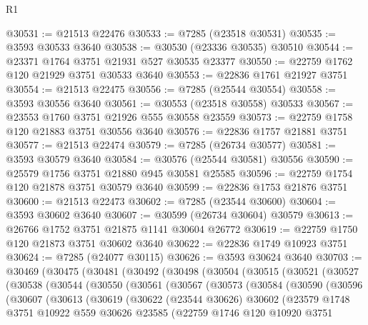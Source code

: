 \begin{lexlean}{R1}
\begin{coremodule}
@30531 := @21513 @22476
@30533 := @7285 (@23518 @30531)
@30535 := @3593 @30533 @3640
@30538 := @30530 (@23336 @30535) @30510
@30544 := @23371 @1764 @3751 @21931 @527 @30535 @23377
@30550 := @22759 @1762 @120 @21929 @3751 @30533 @3640
@30553 := @22836 @1761 @21927 @3751
@30554 := @21513 @22475
@30556 := @7285 (@25544 @30554)
@30558 := @3593 @30556 @3640
@30561 := @30553 (@23518 @30558) @30533
@30567 := @23553 @1760 @3751 @21926 @555 @30558 @23559
@30573 := @22759 @1758 @120 @21883 @3751 @30556 @3640
@30576 := @22836 @1757 @21881 @3751
@30577 := @21513 @22474
@30579 := @7285 (@26734 @30577)
@30581 := @3593 @30579 @3640
@30584 := @30576 (@25544 @30581) @30556
@30590 := @25579 @1756 @3751 @21880 @945 @30581 @25585
@30596 := @22759 @1754 @120 @21878 @3751 @30579 @3640
@30599 := @22836 @1753 @21876 @3751
@30600 := @21513 @22473
@30602 := @7285 (@23544 @30600)
@30604 := @3593 @30602 @3640
@30607 := @30599 (@26734 @30604) @30579
@30613 := @26766 @1752 @3751 @21875 @1141 @30604 @26772
@30619 := @22759 @1750 @120 @21873 @3751 @30602 @3640
@30622 := @22836 @1749 @10923 @3751
@30624 := @7285 (@24077 @30115)
@30626 := @3593 @30624 @3640
@30703 := @30469
    (@30475
      (@30481
        (@30492
          (@30498
            (@30504
              (@30515
                (@30521
                  (@30527
                    (@30538
                      (@30544
                        (@30550
                          (@30561
                            (@30567
                              (@30573
                                (@30584
                                  (@30590
                                    (@30596
                                      (@30607
                                        (@30613
                                          (@30619
                                            (@30622
                                              (@23544 @30626)
                                              @30602
                                              (@23579
                                                @1748
                                                @3751
                                                @10922
                                                @559
                                                @30626
                                                @23585
                                                (@22759
                                                  @1746
                                                  @120
                                                  @10920
                                                  @3751

\end{coremodule}
\end{lexlean}
